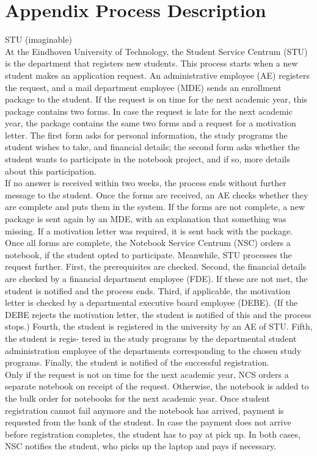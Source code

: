 \section{Appendix Process Description}\label{app:appendix_exercise}
STU (imaginable)\\
At the Eindhoven University of Technology, the Student Service Centrum
(STU) is the department that registers new students. This process starts
when a new student makes an application request. An administrative
employee (AE) registers the request, and a mail department employee
(MDE) sends an enrollment package to the student. If the request is on
time for the next academic year, this package contains two forms. In case
the request is late for the next academic year, the package contains the
same two forms and a request for a motivation letter. The first form asks
for personal information, the study programs the student wishes to take,
and financial details; the second form asks whether the student wants to
participate in the notebook project, and if so, more details about this
participation.\\
If no answer is received within two weeks, the process ends without further
message to the student. Once the forms are received, an AE checks
whether they are complete and puts them in the system. If the forms are
not complete, a new package is sent again by an MDE, with an explanation
that something was missing. If a motivation letter was required, it is sent
back with the package.\\
Once all forms are complete, the Notebook Service Centrum (NSC) orders
a notebook, if the student opted to participate. Meanwhile, STU processes
the request further. First, the prerequisites are checked. Second, the financial 
details are checked by a financial department employee (FDE). If
these are not met, the student is notified and the process ends. Third, if
applicable, the motivation letter is checked by a departmental executive
board employee (DEBE). (If the DEBE rejects the motivation letter, the
student is notified of this and the process stops.) Fourth, the student is
registered in the university by an AE of STU. Fifth, the student is regis-
tered in the study programs by the departmental student administration
employee of the departments corresponding to the chosen study programs.
Finally, the student is notified of the successful registration.\\
Only if the request is not on time for the next academic year, NCS orders
a separate notebook on receipt of the request. Otherwise, the notebook is
added to the bulk order for notebooks for the next academic year. Once
student registration cannot fail anymore and the notebook has arrived,
payment is requested from the bank of the student. In case the payment
does not arrive before registration completes, the student has to pay at
pick up. In both cases, NSC notifies the student, who picks up the laptop
and pays if necessary.\\

\clearpage
